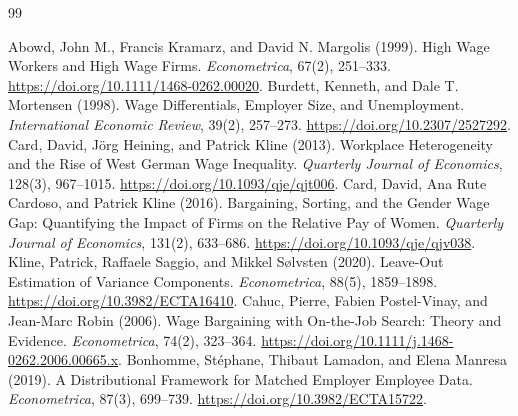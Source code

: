 \documentclass[11pt,letterpaper]{article}
\begin{document}
\clearpage
\begin{thebibliography}{99}
 Abowd, John M., Francis Kramarz, and David N. Margolis (1999).
High Wage Workers and High Wage Firms. \emph{Econometrica}, 67(2), 251--333.
\url{https://doi.org/10.1111/1468-0262.00020}.
 Burdett, Kenneth, and Dale T. Mortensen (1998).
Wage Differentials, Employer Size, and Unemployment.
\emph{International Economic Review}, 39(2), 257--273.
\url{https://doi.org/10.2307/2527292}.
 Card, David, J\"org Heining, and Patrick Kline (2013).
Workplace Heterogeneity and the Rise of West German Wage Inequality.
\emph{Quarterly Journal of Economics}, 128(3), 967--1015.
\url{https://doi.org/10.1093/qje/qjt006}.
 Card, David, Ana Rute Cardoso, and Patrick Kline (2016).
Bargaining, Sorting, and the Gender Wage Gap: Quantifying the Impact of
Firms on the Relative Pay of Women.
\emph{Quarterly Journal of Economics}, 131(2), 633--686.
\url{https://doi.org/10.1093/qje/qjv038}.
 Kline, Patrick, Raffaele Saggio, and Mikkel S{\o}lvsten (2020).
Leave-Out Estimation of Variance Components.
\emph{Econometrica}, 88(5), 1859--1898.
\url{https://doi.org/10.3982/ECTA16410}.
 Cahuc, Pierre, Fabien Postel-Vinay, and Jean-Marc Robin (2006).
Wage Bargaining with On-the-Job Search: Theory and Evidence.
\emph{Econometrica}, 74(2), 323--364.
\url{https://doi.org/10.1111/j.1468-0262.2006.00665.x}.
 Bonhomme, St\'ephane, Thibaut Lamadon, and Elena Manresa (2019).
A Distributional Framework for Matched Employer Employee Data.
\emph{Econometrica}, 87(3), 699--739.
\url{https://doi.org/10.3982/ECTA15722}.
\end{thebibliography}
\end{document}
